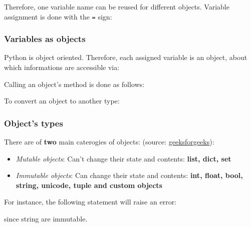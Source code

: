 \begin{frame}[fragile]
    Therefore, one variable name can be reused for different objects. Variable assignment is done with the \verb+=+ sign:
    

\end{frame}


\begin{frame}[fragile]
    \frametitle{Variables as objects}

    Python is object oriented. Therefore, each assigned variable is an object, about which informations are accessible via:
    

    \vspace{1em}
    Calling an object's method is done as follows:
    

    \vspace{1em}
    To convert an object to another type:
    

\end{frame}
    
\begin{frame}[fragile]
    \frametitle{Object's types}

    There are of \textbf{two} main caterogies of objects: (source: \href{https://www.geeksforgeeks.org/mutable-vs-immutable-objects-in-python/}{geeksforgeeks}): \\
    \begin{itemize}
        \item{\emph{Mutable objects}: Can't change their state and contents: \textbf{list, dict, set}}
        \item{\emph{Immutable objects}: Can change their state and contents: \textbf{int, float, bool, string, unicode, tuple and custom objects}}
    \end{itemize}

    \vspace{1em}
    For instance, the following statement will raise an error:
    

    since string are immutable.

\end{frame}
